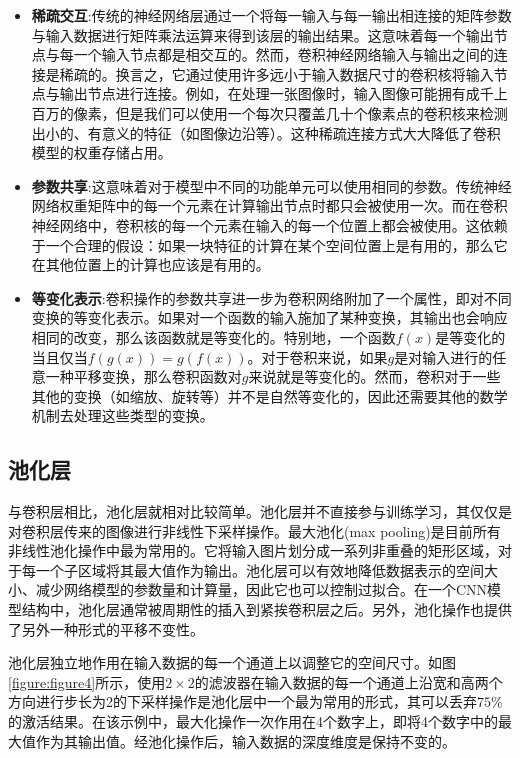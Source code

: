 \begin{itemize}
  \item \textbf{稀疏交互}:传统的神经网络层通过一个将每一输入与每一输出相连接的矩阵参数与输入数据进行矩阵乘法运算来得到该层的输出结果。这意味着每一个输出节点与每一个输入节点都是相交互的。然而，卷积神经网络输入与输出之间的连接是稀疏的。换言之，它通过使用许多远小于输入数据尺寸的卷积核将输入节点与输出节点进行连接。例如，在处理一张图像时，输入图像可能拥有成千上百万的像素，但是我们可以使用一个每次只覆盖几十个像素点的卷积核来检测出小的、有意义的特征（如图像边沿等）。这种稀疏连接方式大大降低了卷积模型的权重存储占用。
  \item  \textbf{参数共享}:这意味着对于模型中不同的功能单元可以使用相同的参数。传统神经网络权重矩阵中的每一个元素在计算输出节点时都只会被使用一次。而在卷积神经网络中，卷积核的每一个元素在输入的每一个位置上都会被使用。这依赖于一个合理的假设：如果一块特征的计算在某个空间位置上是有用的，那么它在其他位置上的计算也应该是有用的。
  \item \textbf{等变化表示}:卷积操作的参数共享进一步为卷积网络附加了一个属性，即对不同变换的等变化表示。如果对一个函数的输入施加了某种变换，其输出也会响应相同的改变，那么该函数就是等变化的。特别地，一个函数$f(x)$是等变化的当且仅当$f(g(x))=g(f(x))$。对于卷积来说，如果$g$是对输入进行的任意一种平移变换，那么卷积函数对$g$来说就是等变化的。然而，卷积对于一些其他的变换（如缩放、旋转等）并不是自然等变化的，因此还需要其他的数学机制去处理这些类型的变换。
\end{itemize}

\subsection{池化层}
\label{chapter:chapter2-1-2}
与卷积层相比，池化层就相对比较简单。池化层并不直接参与训练学习，其仅仅是对卷积层传来的图像进行非线性下采样操作。最大池化(max pooling)是目前所有非线性池化操作中最为常用的。它将输入图片划分成一系列非重叠的矩形区域，对于每一个子区域将其最大值作为输出。池化层可以有效地降低数据表示的空间大小、减少网络模型的参数量和计算量，因此它也可以控制过拟合。在一个CNN模型结构中，池化层通常被周期性的插入到紧挨卷积层之后。另外，池化操作也提供了另外一种形式的平移不变性。

池化层独立地作用在输入数据的每一个通道上以调整它的空间尺寸。如图\ref{figure:figure4}所示，使用$2\times2$的滤波器在输入数据的每一个通道上沿宽和高两个方向进行步长为2的下采样操作是池化层中一个最为常用的形式，其可以丢弃$75\%$的激活结果。在该示例中，最大化操作一次作用在4个数字上，即将4个数字中的最大值作为其输出值。经池化操作后，输入数据的深度维度是保持不变的。

